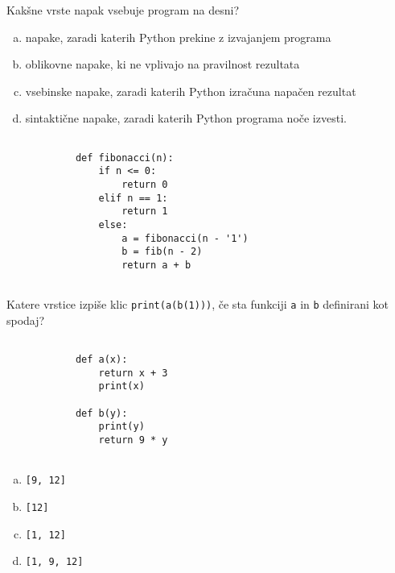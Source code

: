 \documentclass[arhiv, 10pt]{../izpit}
\newcommand{\inlinepy}[1]{\texttt{#1}}
\begin{document}
        \naloga*
        \begin{multicols}{2}
        \noindent
        Kakšne vrste napak vsebuje program na desni?

        \begin{enumerate}[(a)]
\item napake, zaradi katerih Python prekine z izvajanjem programa
\item oblikovne napake, ki ne vplivajo na pravilnost rezultata
\item vsebinske napake, zaradi katerih Python izračuna napačen rezultat
\item sintaktične napake, zaradi katerih Python programa noče izvesti.
\end{enumerate}

        \columnbreak

        \begin{verbatim}
        
            def fibonacci(n):
                if n <= 0:
                    return 0
                elif n == 1:
                    return 1
                else:
                    a = fibonacci(n - '1')
                    b = fib(n - 2)
                    return a + b
            
        \end{verbatim}

        \end{multicols}

    
        \naloga*
        Katere vrstice izpiše klic \inlinepy{print(a(b(1)))}, če sta funkciji \inlinepy{a} in \inlinepy{b} definirani kot spodaj?

        \begin{multicols}{2}
        \begin{verbatim}
        
            def a(x):
                return x + 3
                print(x)

            def b(y):
                print(y)
                return 9 * y
        
        \end{verbatim}

        \begin{enumerate}[(a)]
\item \inlinepy{[9, 12]}
\item \inlinepy{[12]}
\item \inlinepy{[1, 12]}
\item \inlinepy{[1, 9, 12]}
\end{enumerate}

        \end{multicols}
    
\end{document}

